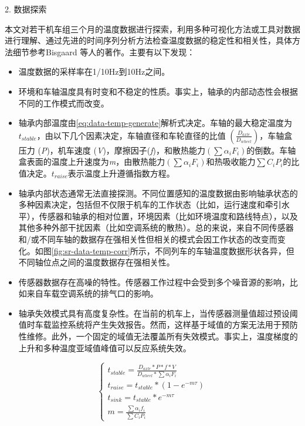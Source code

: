 2. 数据探索

本文对若干机车组三个月的温度数据进行探索，利用多种可视化方法或工具对数据进行理解、通过先进的时间序列分析方法检查温度数据的稳定性和相关性，具体方法细节参考Bisgaard 等人的著作\cite{bisgaard2011time}。主要有以下发现：
\begin{itemize}
  \item 温度数据的采样率在1/10Hz到10Hz之间。
  \item 环境和车轴温度具有时变和不稳定的性质。事实上，轴承的内部动态性会根据不同的工作模式而改变。
  \item 轴承内部温度由\ref{eq:data-temp-generate}解析式决定\cite{陈德生2003列车轴温规律及红外线轴温探测方式的研究}。车轴的最大稳定温度为$t_{stable}$，由以下几个因素决定，车轴直径和车轮直径的比值 $(\frac{D_{axle}}{D_{wheel}})$，车轴盒压力 (\emph{P})，机车速度 (\emph{V})，摩擦因子(\emph{f})，和散热能力$(\sum {\alpha_{i}F_{i}})$的倒数。车轴盒表面的温度上升速度为\emph{m}，由散热能力$(\sum {\alpha_{i}F_{i}})$和热吸收能力$\sum {C_{i}P_{i}}$的比值决定。$t_{raise}$表示温度上升遵循指数方程。
  \item 轴承内部状态通常无法直接探测。不同位置感知的温度数据由影响轴承状态的多种因素决定，包括但不仅限于机车的工作状态（比如，运行速度和牵引水平），传感器和轴承的相对位置，环境因素（比如环境温度和路线特点），以及其他多种外部干扰因素（比如空调系统的散热）。总的来说，来自不同传感器和/或不同车轴的数据存在强相关性但相关的模式会因工作状态的改变而变化。如图\ref{fig:sr-data-temp-corr}所示，不同列车的车轴温度数据形状各异，但不同轴位点之间的温度数据存在强相关性。
  \item 传感器数据存在高噪的特性。传感器工作过程中会受到多个噪音源的影响，比如来自车载空调系统的排气口的影响。
  \item 轴承失效模式具有高度复杂性。在当前的机车上，当传感器测量值超过预设阈值时车载监控系统将产生失效报告。然而，这样基于域值的方案无法用于预防性维修。此外，一个固定的域值无法覆盖所有失效模式。事实上，温度梯度的上升和多种温度亚域值峰值可以反应系统失效。
\end{itemize}
\begin{equation}
\label{eq:data-temp-generate}
\left\{\begin{array}{l}
t_{stable} = \frac{D_{axle}\ast P\ast f \ast V}{D_{wheel}\ast \sum \alpha_{i}F_{i}}  \\[0.2cm]
t_{raise} = t_{stable}\ast (1-e^{-m\tau}) \\[0.2cm]
t_{sink} = t_{stable} \ast e^{-m\tau} \\[0.2cm]
m = \frac{\sum \alpha_{i}f_{i}}{\sum C_{i}P_{i}}
\end{array}\right.
\end{equation}


